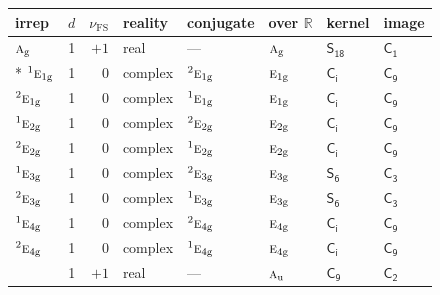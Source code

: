 \documentclass[10pt,a4paper]{article}
\numberwithin{equation}{section}
\newcommand{\grp}[1]{\mathsf{#1}}
\newcommand{\irr}[1]{\text{\normalfont\scshape #1}}
\newcommand{\conjpair}[1]{{}^{#1}}
\newcommand{\detbox}[1]{{\setlength{\fboxsep}{1pt}\fbox{#1}}}
\newcommand{\ptag}[1]{\mathrm{#1}}
\newcommand{\fsind}{\nu_{\mathrm{FS}}}
\begin{document}
{\small\renewcommand{\arraystretch}{1.25}\setlength{\tabcolsep}{4pt}\begin{longtable}{@{}lrrlllll@{}}\toprule
irrep & $d$ & $\fsind$ & reality & conjugate & over $\mathbb{R}$ & kernel & image\\\midrule\endhead
\bottomrule\endfoot\endlastfoot
$\irr{a}_{\ptag{g}}$ & 1 & $+1$ & real & --- & $\irr{a}_{\ptag{g}}$ & \href{S18.pdf}{$\grp{S_{18}}$} & \href{../../../rotation/data/pdf/C1.pdf}{$\grp{C_{1}}$}\\*
$\conjpair{1}\irr{e}_{1\ptag{g}}$ & 1 & $0$ & complex & $\conjpair{2}\irr{e}_{1\ptag{g}}$ & $\irr{e}_{1\ptag{g}}$ & \href{S2.pdf}{$\grp{C_{i}}$} & \href{../../../rotation/data/pdf/C9.pdf}{$\grp{C_{9}}$}\\
$\conjpair{2}\irr{e}_{1\ptag{g}}$ & 1 & $0$ & complex & $\conjpair{1}\irr{e}_{1\ptag{g}}$ & $\irr{e}_{1\ptag{g}}$ & \href{S2.pdf}{$\grp{C_{i}}$} & \href{../../../rotation/data/pdf/C9.pdf}{$\grp{C_{9}}$}\\
$\conjpair{1}\irr{e}_{2\ptag{g}}$ & 1 & $0$ & complex & $\conjpair{2}\irr{e}_{2\ptag{g}}$ & $\irr{e}_{2\ptag{g}}$ & \href{S2.pdf}{$\grp{C_{i}}$} & \href{../../../rotation/data/pdf/C9.pdf}{$\grp{C_{9}}$}\\
$\conjpair{2}\irr{e}_{2\ptag{g}}$ & 1 & $0$ & complex & $\conjpair{1}\irr{e}_{2\ptag{g}}$ & $\irr{e}_{2\ptag{g}}$ & \href{S2.pdf}{$\grp{C_{i}}$} & \href{../../../rotation/data/pdf/C9.pdf}{$\grp{C_{9}}$}\\
$\conjpair{1}\irr{e}_{3\ptag{g}}$ & 1 & $0$ & complex & $\conjpair{2}\irr{e}_{3\ptag{g}}$ & $\irr{e}_{3\ptag{g}}$ & \href{S6.pdf}{$\grp{S_{6}}$} & \href{../../../rotation/data/pdf/C3.pdf}{$\grp{C_{3}}$}\\
$\conjpair{2}\irr{e}_{3\ptag{g}}$ & 1 & $0$ & complex & $\conjpair{1}\irr{e}_{3\ptag{g}}$ & $\irr{e}_{3\ptag{g}}$ & \href{S6.pdf}{$\grp{S_{6}}$} & \href{../../../rotation/data/pdf/C3.pdf}{$\grp{C_{3}}$}\\
$\conjpair{1}\irr{e}_{4\ptag{g}}$ & 1 & $0$ & complex & $\conjpair{2}\irr{e}_{4\ptag{g}}$ & $\irr{e}_{4\ptag{g}}$ & \href{S2.pdf}{$\grp{C_{i}}$} & \href{../../../rotation/data/pdf/C9.pdf}{$\grp{C_{9}}$}\\
$\conjpair{2}\irr{e}_{4\ptag{g}}$ & 1 & $0$ & complex & $\conjpair{1}\irr{e}_{4\ptag{g}}$ & $\irr{e}_{4\ptag{g}}$ & \href{S2.pdf}{$\grp{C_{i}}$} & \href{../../../rotation/data/pdf/C9.pdf}{$\grp{C_{9}}$}\\
\detbox{$\irr{a}_{\ptag{u}}$} & 1 & $+1$ & real & --- & $\irr{a}_{\ptag{u}}$ & \href{C9.pdf}{$\grp{C_{9}}$} & \href{../../../rotation/data/pdf/C2.pdf}{$\grp{C_{2}}$}\\

\end{longtable}}
\end{document}
